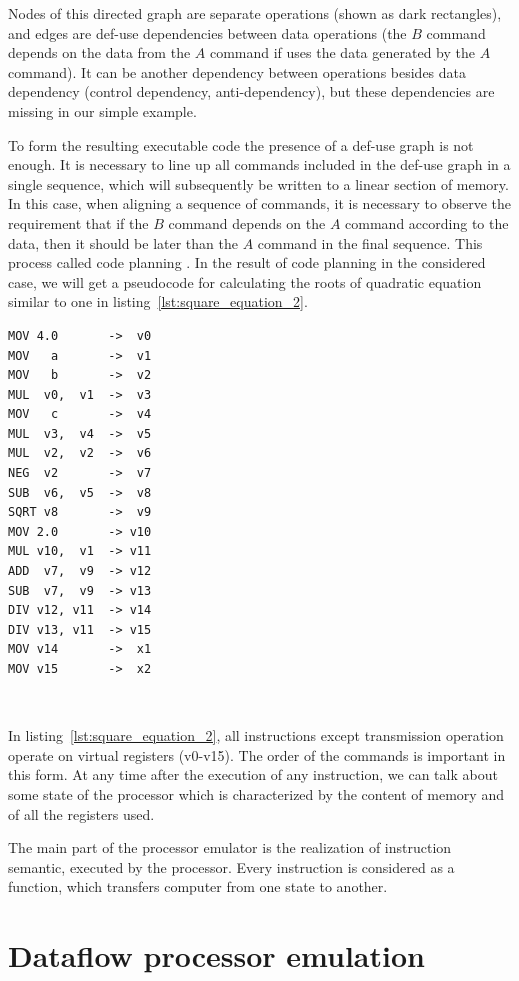\documentclass[
11pt,%
tightenlines,%
twoside,%
onecolumn,%
nofloats,%
nobibnotes,%
nofootinbib,%
superscriptaddress,%
noshowpacs,%
centertags]%
{revtex4}
\begin{document}
Nodes of this directed graph are separate operations (shown as dark rectangles), and edges are def-use dependencies between data operations (the $B$ command depends on the data from the $A$ command if uses the data generated by the $A$ command).
It can be another dependency between operations besides data dependency (control dependency, anti-dependency), but these dependencies are missing in our simple example.

To form the resulting executable code the presence of a def-use graph is not enough.
It is necessary to line up all commands included in the def-use graph in a single sequence, which will subsequently be written to a linear section of memory.
In this case, when aligning a sequence of commands, it is necessary to observe the requirement that if the $B$ command depends on the $A$ command according to the data, then it should be later than the $A$ command in the final sequence.
This process called code planning \cite{Aho}.
In the result of code planning in the considered case, we will get a pseudocode for calculating the roots of quadratic equation similar to one in listing~\ref{lst:square_equation_2}.

\begin{lstlisting}[caption={Pseudocode for calculating the roots of  quadratic equation.},label={lst:square_equation_2}]
MOV 4.0       ->  v0
MOV   a       ->  v1
MOV   b       ->  v2
MUL  v0,  v1  ->  v3
MOV   c       ->  v4
MUL  v3,  v4  ->  v5
MUL  v2,  v2  ->  v6
NEG  v2       ->  v7
SUB  v6,  v5  ->  v8
SQRT v8       ->  v9
MOV 2.0       -> v10
MUL v10,  v1  -> v11
ADD  v7,  v9  -> v12
SUB  v7,  v9  -> v13
DIV v12, v11  -> v14
DIV v13, v11  -> v15
MOV v14       ->  x1
MOV v15       ->  x2
\end{lstlisting}

\

In listing~\ref{lst:square_equation_2}, all instructions except transmission operation operate on virtual registers (v0-v15).
The order of the commands is important in this form.
At any time after the execution of any instruction, we can talk about some state of the processor which is characterized by the content of memory and of all the registers used.

The main part of the processor emulator is the realization of instruction semantic, executed by the processor.
Every instruction is considered as a function, which transfers computer from one state to another.

\section{Dataflow processor emulation}
\end{document}
